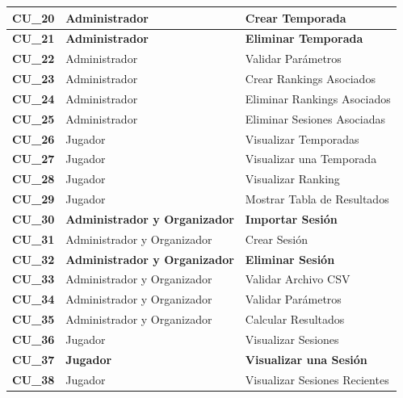 \begin{center}
\begin{tabular}{| p{1.5cm} | p{6.5cm} | p{5.5cm} |}
    {\textbf{CU\_20}} & \textbf{Administrador} & \textbf{Crear Temporada}\\ \hline
    {\textbf{CU\_21}} & \textbf{Administrador} & \textbf{Eliminar Temporada}\\ \hline
    {\textbf{CU\_22}} & Administrador & Validar Parámetros\\\hline
    {\textbf{CU\_23}} & Administrador & Crear Rankings Asociados\\ \hline
    {\textbf{CU\_24}} & Administrador & Eliminar Rankings Asociados\\ \hline
    {\textbf{CU\_25}} & Administrador & Eliminar Sesiones Asociadas\\ \hline
    
    {\textbf{CU\_26}} & Jugador & Visualizar Temporadas\\ \hline
    {\textbf{CU\_27}} & Jugador & Visualizar una Temporada\\ \hline
    {\textbf{CU\_28}} & Jugador & Visualizar Ranking\\ \hline
    {\textbf{CU\_29}} & Jugador & Mostrar Tabla de Resultados\\ \hline
    
    {\textbf{CU\_30}} & \textbf{Administrador y Organizador} & \textbf{Importar Sesión}\\ \hline
    {\textbf{CU\_31}} & Administrador y Organizador & Crear Sesión\\ \hline
    {\textbf{CU\_32}} & \textbf{Administrador y Organizador} & \textbf{Eliminar Sesión}\\ \hline
    {\textbf{CU\_33}} & Administrador y Organizador & Validar Archivo CSV\\ \hline
    {\textbf{CU\_34}} & Administrador y Organizador & Validar Parámetros\\ \hline
    {\textbf{CU\_35}} & Administrador y Organizador & Calcular Resultados\\ \hline
    
    {\textbf{CU\_36}} & Jugador & Visualizar Sesiones\\ \hline
    {\textbf{CU\_37}} & \textbf{Jugador} & \textbf{Visualizar una Sesión}\\ \hline
    {\textbf{CU\_38}} & Jugador & Visualizar Sesiones Recientes\\ \hline
  \end{tabular}
  
  \label{table:usecase:specification}
\end{center}

